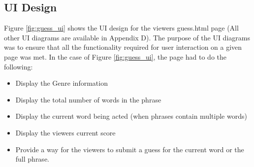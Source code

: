 \newpage

\subsection{UI Design}
\begin{figure}[h!]
\end{figure}

Figure \ref{fig:guess_ui} shows the UI design for the viewers guess.html page (All other UI diagrams are available in Appendix D). The purpose of the UI diagrams was to ensure that all the functionality required for user interaction on a given page was met. In the case of Figure \ref{fig:guess_ui}, the page had to do the following:
\begin{itemize}
	\item Display the Genre information
	
	\item Display the total number of words in the phrase
	
	\item Display the current word being acted (when phrases contain multiple words)
	
	\item Display the viewers current score
	
	\item Provide a way for the viewers to submit a guess for the current word or the full phrase.
\end{itemize}

